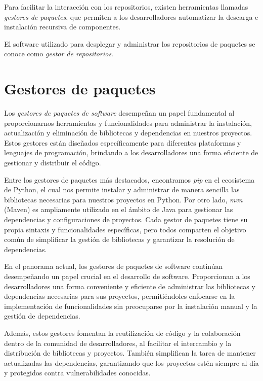 Para facilitar la interacción con los repositorios, existen herramientas llamadas \textit{gestores de
    paquetes}, que permiten a los desarrolladores automatizar la descarga e instalación recursiva de
componentes.

El software utilizado para desplegar y administrar los repositorios de paquetes se conoce como
\textit{gestor de repositorios}.

\section{Gestores de paquetes}

Los \textit{gestores de paquetes de software} desempeñan un papel fundamental al proporcionarnos
herramientas y funcionalidades para administrar la instalación, actualización y eliminación de
bibliotecas y dependencias en nuestros proyectos. Estos gestores están diseñados específicamente
para diferentes plataformas y lenguajes de programación, brindando a los desarrolladores una forma
eficiente de gestionar y distribuir el código.

Entre los gestores de paquetes más destacados, encontramos \textit{pip} en el ecosistema de Python,
el cual nos permite instalar y administrar de manera sencilla las bibliotecas necesarias para
nuestros proyectos en Python. Por otro lado, \textit{mvn} (Maven) es ampliamente utilizado en el
ámbito de Java para gestionar las dependencias y configuraciones de proyectos. Cada gestor de paquetes
tiene su propia sintaxis y funcionalidades específicas, pero todos comparten el objetivo común de
simplificar la gestión de bibliotecas y garantizar la resolución de dependencias.

En el panorama actual, los gestores de paquetes de software continúan desempeñando un papel
crucial en el desarrollo de software. Proporcionan a los desarrolladores una forma conveniente
y eficiente de administrar las bibliotecas y dependencias necesarias para sus proyectos, permitiéndoles
enfocarse en la implementación de funcionalidades sin preocuparse por la instalación manual y la
gestión de dependencias.

Además, estos gestores fomentan la reutilización de código y la colaboración dentro de la comunidad de desarrolladores, al facilitar el intercambio y la distribución de bibliotecas y proyectos. También simplifican la tarea de mantener actualizadas las dependencias, garantizando que los proyectos estén siempre al día y protegidos contra vulnerabilidades conocidas.


